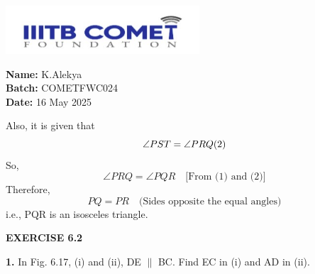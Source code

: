 \documentclass[a4paper,12pt]{article}
\begin{document}
\begin{minipage}{0.6\textwidth}
   \vspace{-9em} \includegraphics[height=1.8cm]{iiitbcomet.jpg} %
\end{minipage}
\hfill
\begin{minipage}{0.35\textwidth}
\raggedleft
\vspace{-9em}
\textbf{Name:} K.Alekya \\
\textbf{Batch:} COMETFWC024 \\
\textbf{Date:} 16 May 2025
\end{minipage}
\pagestyle{fancy}
\fancyhf{}
\vspace{-1em}

\cfoot{\textcolor{black}{Reprint 2025-26}}
\renewcommand{\headrulewidth}{0.4pt}
\renewcommand{\headrule}{\hbox to\headwidth{\color{ncertblue}\leaders\hrule height \headrulewidth\hfill}}
\setlength{\parindent}{0pt}
Also, it is given that
\[
\angle PST = \angle PRQ \hfill (2)
\]
So,  
\[
\angle PRQ = \angle PQR \quad \text{[From (1) and (2)]}
\]
Therefore,  
\[
PQ = PR \quad \text{(Sides opposite the equal angles)}
\]
i.e., \quad PQR is an isosceles triangle.
\vspace{1em}

\begin{center}
\textcolor{ncertblue}{\textbf{EXERCISE 6.2}}
\end{center}

\textbf{1.} In Fig. 6.17, (i) and (ii), DE $\parallel$ BC. Find EC in (i) and AD in (ii).
\end{document}
